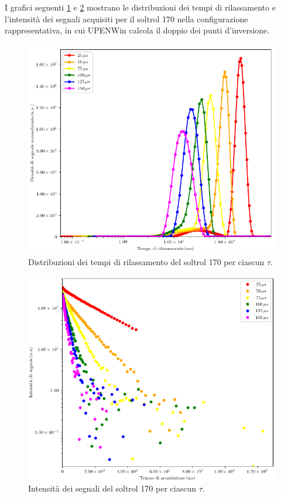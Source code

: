 I grafici seguenti \ref{fig:D_s170} e \ref{fig:S_s170} mostrano le distribuzioni dei tempi di rilassamento e l'intensità dei segnali acquisiti per il soltrol 170 nella configurazione rappresentativa, in cui UPENWin calcola il doppio dei punti d'inversione.

\begin{figure}[ht]
\centering
\includegraphics[width=\columnwidth]{Figure/SOLTROL170.png}
\caption{Distribuzioni dei tempi di rilassamento del soltrol 170 per ciascun $\tau$.}
\label{fig:D_s170}
\end{figure}

\begin{figure}[ht]
\centering
\includegraphics[width=\columnwidth]{Figure/SOLTROL170_SigTSig.png}
\caption{Intensità dei segnali del soltrol 170 per ciascun $\tau$.}
\label{fig:S_s170}
\end{figure}

